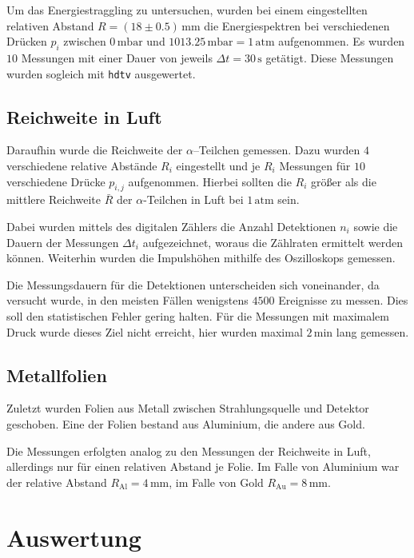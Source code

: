 \documentclass[12pt,a4paper]{scrartcl}
\numberwithin{equation}{section} %
\begin{document}
Um das Energiestraggling zu untersuchen, wurden bei einem eingestellten relativen Abstand $R=(18\pm 0.5)\mathrm{\,mm}$ die Energiespektren bei verschiedenen Drücken $p_i$ zwischen $0\mathrm{\,mbar}$ und $1013.25\mathrm{\,mbar}=1\mathrm{\,atm}$ aufgenommen. Es wurden $10$ Messungen mit einer Dauer von jeweils $\Delta t=30\mathrm{\,s}$ getätigt. Diese Messungen wurden sogleich mit \texttt{hdtv} \cite{hdtv} ausgewertet.

\hypertarget{reichweite-in-luft}{%
\subsection{Reichweite in Luft}\label{reichweite-in-luft}}

Daraufhin wurde die Reichweite der $\alpha$--Teilchen gemessen. Dazu wurden $4$ verschiedene relative Abstände $R_i$ eingestellt und je $R_i$ Messungen für $10$ verschiedene Drücke $p_{i,j}$ aufgenommen. Hierbei sollten die $R_i$ größer als die mittlere Reichweite $\bar R$ der $\alpha$-Teilchen in Luft bei $1\mathrm{\,atm}$ sein.

Dabei wurden mittels des digitalen Zählers die Anzahl Detektionen $n_i$ sowie die Dauern der Messungen $\Delta t_i$ aufgezeichnet, woraus die Zählraten ermittelt werden können. Weiterhin wurden die Impulshöhen mithilfe des Oszilloskops gemessen.

Die Messungsdauern für die Detektionen unterscheiden sich voneinander, da versucht wurde, in den meisten Fällen wenigstens $4500$ Ereignisse zu messen. Dies soll den statistischen Fehler gering halten. Für die Messungen mit maximalem Druck wurde dieses Ziel nicht erreicht, hier wurden maximal $2\mathrm{\,min}$ lang gemessen.

\hypertarget{metallfolien}{%
\subsection{Metallfolien}\label{metallfolien}}

Zuletzt wurden Folien aus Metall zwischen Strahlungsquelle und Detektor geschoben. Eine der Folien bestand aus Aluminium, die andere aus Gold.

Die Messungen erfolgten analog zu den Messungen der Reichweite in Luft, allerdings nur für einen relativen Abstand je Folie. Im Falle von Aluminium war der relative Abstand $R_\mathrm{Al}=4\mathrm{\,mm}$, im Falle von Gold $R_\mathrm{Au}=8\mathrm{\,mm}$.

\hypertarget{auswertung}{%
\section{Auswertung}\label{auswertung}}
\end{document}
